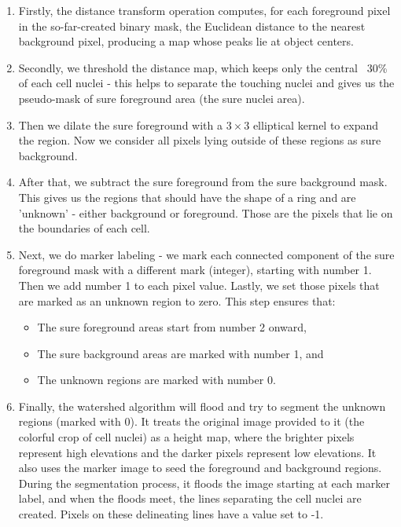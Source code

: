 \begin{enumerate}
    \item Firstly, the distance transform operation computes, for each foreground pixel in the so-far-created binary mask, the Euclidean distance to the nearest background pixel, producing a map whose peaks lie at object centers.
    \item Secondly, we threshold the distance map, which keeps only the central ~30\% of each cell nuclei - this helps to separate the touching nuclei and gives us the pseudo-mask of sure foreground area (the sure nuclei area).
    \item Then we dilate the sure foreground with a $3\!\times\!3$ elliptical kernel to expand the region. Now we consider all pixels lying outside of these regions as sure background.
    \item After that, we subtract the sure foreground from the sure background mask. This gives us the regions that should have the shape of a ring and are 'unknown' - either background or foreground. Those are the pixels that lie on the boundaries of each cell.
    \item Next, we do marker labeling - we mark each connected component of the sure foreground mask with a different mark (integer), starting with number 1. Then we add number 1 to each pixel value. Lastly, we set those pixels that are marked as an unknown region to zero. This step ensures that:
    \begin{itemize}
        \item The sure foreground areas start from number 2 onward,
        \item The sure background areas are marked with number 1, and
        \item The unknown regions are marked with number 0.
    \end{itemize}
    \item Finally, the watershed algorithm will flood and try to segment the unknown regions (marked with 0). It treats the original image provided to it (the colorful crop of cell nuclei) as a height map, where the brighter pixels represent high elevations and the darker pixels represent low elevations. It also uses the marker image to seed the foreground and background regions. During the segmentation process, it floods the image starting at each marker label, and when the floods meet, the lines separating the cell nuclei are created. Pixels on these delineating lines have a value set to -1.
\end{enumerate}

